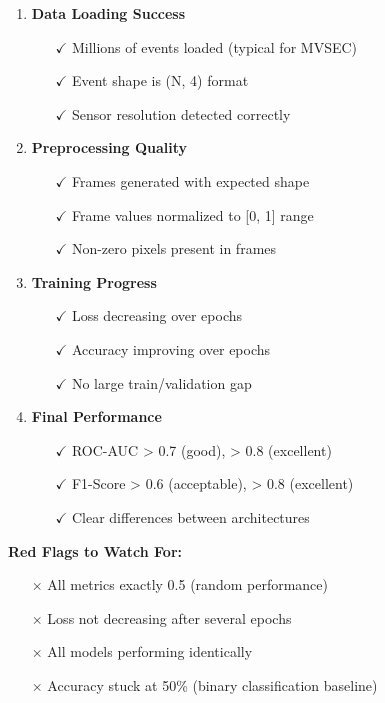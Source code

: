 \documentclass[12pt,a4paper]{article}
\begin{document}
\begin{enumerate}
    \item \textbf{Data Loading Success}
    \begin{itemize}
        \item[$\checkmark$] Millions of events loaded (typical for MVSEC)
        \item[$\checkmark$] Event shape is (N, 4) format
        \item[$\checkmark$] Sensor resolution detected correctly
    \end{itemize}
    
    \item \textbf{Preprocessing Quality}
    \begin{itemize}
        \item[$\checkmark$] Frames generated with expected shape
        \item[$\checkmark$] Frame values normalized to [0, 1] range
        \item[$\checkmark$] Non-zero pixels present in frames
    \end{itemize}
    
    \item \textbf{Training Progress}
    \begin{itemize}
        \item[$\checkmark$] Loss decreasing over epochs
        \item[$\checkmark$] Accuracy improving over epochs
        \item[$\checkmark$] No large train/validation gap
    \end{itemize}
    
    \item \textbf{Final Performance}
    \begin{itemize}
        \item[$\checkmark$] ROC-AUC > 0.7 (good), > 0.8 (excellent)
        \item[$\checkmark$] F1-Score > 0.6 (acceptable), > 0.8 (excellent)
        \item[$\checkmark$] Clear differences between architectures
    \end{itemize}
\end{enumerate}

\textbf{Red Flags to Watch For:}
\begin{itemize}
    \item[$\times$] All metrics exactly 0.5 (random performance)
    \item[$\times$] Loss not decreasing after several epochs
    \item[$\times$] All models performing identically
    \item[$\times$] Accuracy stuck at 50\% (binary classification baseline)
\end{itemize}
\end{document}
